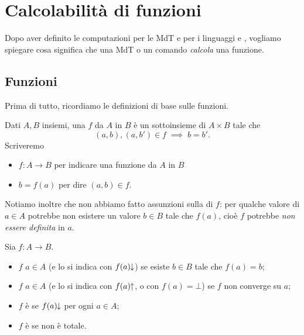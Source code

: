 \section{Calcolabilità di funzioni}

Dopo aver definito le computazioni per le MdT e per i linguaggi  e , vogliamo spiegare cosa significa che una MdT o un comando \emph{calcola} una funzione. 

\subsection*{Funzioni}

Prima di tutto, ricordiamo le definizioni di base sulle funzioni.

\begin{definition}
    [Funzione][func]
    Dati $A, B$ insiemi, una  $f$ da $A$ in $B$ è un sottoinsieme di $A \times B$ tale che \[
        (a, b), (a, b') \in f \;\implies\; b = b'.
    \] Scriveremo \begin{itemize}
        \item $f : A \to B$ per indicare una funzione da $A$ in $B$
        \item $b = f(a)$ per dire $(a, b) \in f$.
    \end{itemize}
\end{definition}

 Notiamo inoltre che non abbiamo fatto assunzioni sulla  di $f$: per qualche valore di $a \in A$ potrebbe non esistere un valore $b \in B$ tale che $f(a)$, cioè $f$ potrebbe \emph{non essere definita} in $a$.

\begin{definition}
    Sia $f : A \to B$. \begin{itemize}
        \item $f$  $a \in A$ (e lo si indica con $f(a)\!\!\downarrow$) se esiste $b \in B$ tale che $f(a) = b$;
        \item $f$  $a \in A$ (e lo si indica con $f(a)\!\!\uparrow$, o con $f(a) = \bot$) se $f$ non converge su $a$;
        \item $f$ è  se $f(a)\!\!\downarrow$ per ogni $a \in A$;
        \item $f$ è  se non è totale.     
    \end{itemize}   
\end{definition}

